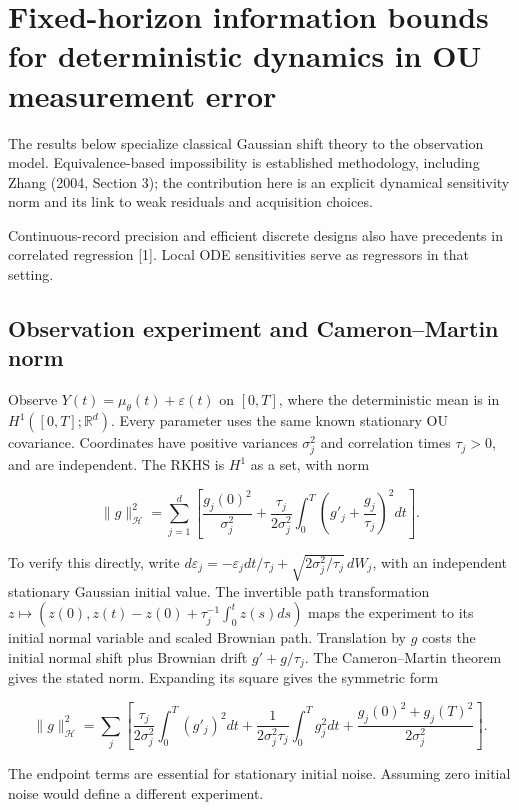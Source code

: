\documentclass[
  11pt,
]{article}
\author{}
\date{}
\begin{document}
\section{Fixed-horizon information bounds for deterministic dynamics in
OU measurement
error}\label{fixed-horizon-information-bounds-for-deterministic-dynamics-in-ou-measurement-error}

The results below specialize classical Gaussian shift theory to the
observation model. Equivalence-based impossibility is established
methodology, including Zhang (2004, Section 3); the contribution here is
an explicit dynamical sensitivity norm and its link to weak residuals
and acquisition choices.

Continuous-record precision and efficient discrete designs also have
precedents in correlated regression {[}1{]}. Local ODE sensitivities
serve as regressors in that setting.

\subsection{Observation experiment and Cameron--Martin
norm}\label{observation-experiment-and-cameronmartin-norm}

Observe \(Y(t)=\mu_\theta(t)+\varepsilon(t)\) on \([0,T]\), where the
deterministic mean is in \(H^1([0,T];\mathbb R^d)\). Every parameter
uses the same known stationary OU covariance. Coordinates have positive
variances \(\sigma_j^2\) and correlation times \(\tau_j>0\), and are
independent. The RKHS is \(H^1\) as a set, with norm

\[
\|g\|_{\mathcal H}^2=\sum_{j=1}^d\left[\frac{g_j(0)^2}{\sigma_j^2}+\frac{\tau_j}{2\sigma_j^2}\int_0^T\left(g'_j+\frac{g_j}{\tau_j}\right)^2dt\right].
\]

To verify this directly, write
\(d\varepsilon_j=-\varepsilon_jdt/\tau_j+\sqrt{2\sigma_j^2/\tau_j}\,dW_j\),
with an independent stationary Gaussian initial value. The invertible
path transformation
\(z\mapsto(z(0),z(t)-z(0)+\tau_j^{-1}\int_0^tz(s)ds)\) maps the
experiment to its initial normal variable and scaled Brownian path.
Translation by \(g\) costs the initial normal shift plus Brownian drift
\(g'+g/\tau_j\). The Cameron--Martin theorem gives the stated norm.
Expanding its square gives the symmetric form

\[
\|g\|_{\mathcal H}^2=\sum_j\left[\frac{\tau_j}{2\sigma_j^2}\int_0^T(g'_j)^2dt+\frac1{2\sigma_j^2\tau_j}\int_0^Tg_j^2dt+\frac{g_j(0)^2+g_j(T)^2}{2\sigma_j^2}\right].
\]

The endpoint terms are essential for stationary initial noise. Assuming
zero initial noise would define a different experiment.
\end{document}
